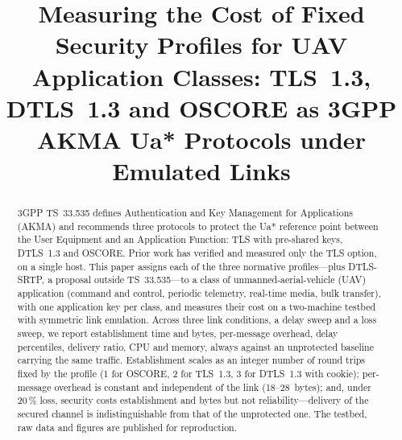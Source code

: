 \documentclass[conference]{IEEEtran}
\begin{document}
\title{Measuring the Cost of Fixed Security Profiles for UAV Application
Classes: TLS~1.3, DTLS~1.3 and OSCORE as 3GPP AKMA Ua* Protocols under
Emulated Links}

\author{
\and
{}
}

\maketitle

\begin{abstract}
3GPP TS~33.535 defines Authentication and Key Management for Applications
(AKMA) and recommends three protocols to protect the Ua* reference point
between the User Equipment and an Application Function: TLS with pre-shared
keys, DTLS~1.3 and OSCORE. Prior work has verified and measured only the TLS
option, on a single host. This paper assigns each of the three normative
profiles---plus DTLS-SRTP, a proposal outside TS~33.535---to a class of
unmanned-aerial-vehicle (UAV) application (command and control, periodic
telemetry, real-time media, bulk transfer), with one application key per
class, and measures their cost on a two-machine testbed with symmetric link
emulation. Across three link conditions, a delay sweep and a loss sweep, we
report establishment time and bytes, per-message overhead, delay
percentiles, delivery ratio, CPU and memory, always against an unprotected
baseline carrying the same traffic. Establishment scales as an integer number
of round trips fixed by the profile (1 for OSCORE, 2 for TLS~1.3, 3 for
DTLS~1.3 with cookie); per-message overhead is constant and independent of
the link (18--28~bytes); and, under 20\,\% loss, security costs
establishment and bytes but not reliability---delivery of the secured channel
is indistinguishable from that of the unprotected one. The testbed, raw data
and figures are published for reproduction.
\end{abstract}
\end{document}
